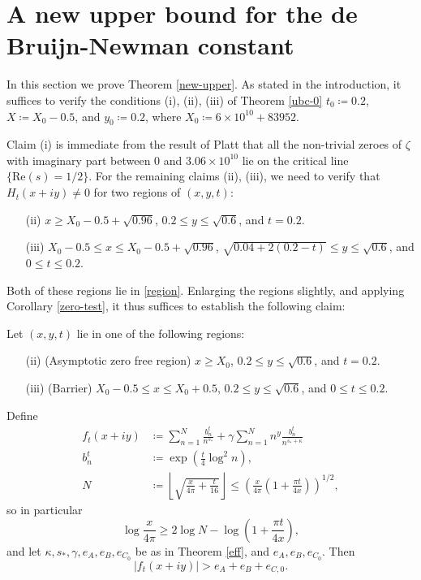 \section{A new upper bound for the de Bruijn-Newman constant}\label{newup-sec}

In this section we prove Theorem \ref{new-upper}.  As stated in the introduction, it suffices to verify the conditions (i), (ii), (iii) of Theorem \ref{ubc-0} $t_0 \coloneqq 0.2$, $X \coloneqq X_0-0.5$, and $y_0 \coloneqq 0.2$, where $X_0 \coloneqq 6 \times 10^{10} + 83952$.  

Claim (i) is immediate from the result of Platt \cite{platt} that all the non-trivial zeroes of $\zeta$ with imaginary part between $0$ and $3.06 \times 10^{10}$ lie on the critical line $\{ \mathrm{Re}(s) = 1/2\}$.  For the remaining claims (ii), (iii), we need to verify that $H_t(x+iy) \neq 0$ for two regions of $(x,y,t)$:
\begin{itemize}
\item[(ii)]  $x \geq X_0 - 0.5 + \sqrt{0.96}$, $0.2 \leq y \leq \sqrt{0.6}$, and $t = 0.2$. 
\item[(iii)]  $X_0 - 0.5 \leq x \leq X_0 - 0.5 + \sqrt{0.96}$, $\sqrt{0.04 + 2(0.2-t)} \leq y \leq \sqrt{0.6}$, and $0 \leq t \leq 0.2$.
\end{itemize}
Both of these regions lie in \eqref{region}.  Enlarging the regions slightly, and applying Corollary \ref{zero-test}, it thus suffices to establish the following claim:

\begin{proposition}\label{sweep}  Let $(x,y,t)$ lie in one of the following regions:
\begin{itemize}
\item[(ii)] (Asymptotic zero free region) $x \geq X_0$, $0.2 \leq y \leq \sqrt{0.6}$, and $t = 0.2$.
\item[(iii)] (Barrier)  $X_0 - 0.5 \leq x \leq X_0 + 0.5$, $0.2 \leq y \leq \sqrt{0.6}$, and $0 \leq t \leq 0.2$.
\end{itemize}
Define
\begin{align*}
f_t(x+iy) &\coloneqq \sum_{n=1}^N \frac{b_n^t}{n^{s_*}} + \gamma \sum_{n=1}^N n^y \frac{b_n^t}{n^{\overline{s_*} + \kappa}}\\
b_n^t &\coloneqq \exp( \frac{t}{4} \log^2 n),\\
N &\coloneqq \left\lfloor \sqrt{\frac{x}{4\pi} + \frac{t}{16}} \right\rfloor \leq \left(\frac{x}{4\pi} (1 + \frac{\pi t}{4x})\right)^{1/2},
\end{align*}
so in particular
\begin{equation}\label{logx}
 \log \frac{x}{4\pi} \geq 2 \log N - \log(1 + \frac{\pi t}{4x}),
\end{equation}
and let $\kappa, s_*, \gamma, e_A, e_B, e_{C_0}$ be as in Theorem \ref{eff}, and $e_A, e_B, e_{C_0}$.  Then
\begin{equation}\label{bbb}
|f_t(x+iy)| > e_A + e_B + e_{C,0}.
\end{equation}
\end{proposition}

